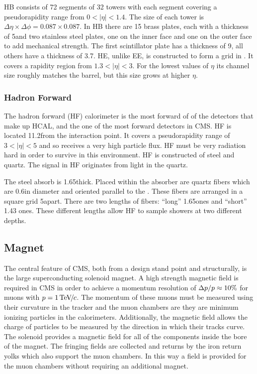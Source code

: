 HB consists of 72 segments of 32 towers with each segment covering a
pseudorapidity range from $0 < |\eta| < 1.4$. The size of each tower is $\Delta
\eta \times \Delta \phi = 0.087 \times 0.087$. In HB there are 15 brass plates,
each with a thickness of 5\centimeters and two stainless steel plates, one on
the inner face and one on the outer face to add mechanical strength. The first
scintillator plate has a thickness of 9\millimeters, all others have a
thickness of 3.7\millimeters. HE, unlike EE, is constructed to form a grid in
\coordetaphi. It covers a rapidity region from $1.3 < |\eta| < 3$. For the
lowest values of $\eta$ its channel size roughly matches the barrel, but this
size grows at higher $\eta$.

\subsubsection{Hadron Forward}

The hadron forward (HF) calorimeter is the most forward of of the detectors
that make up HCAL, and the one of the most forward detectors in CMS. HF is
located 11.2\meters from the interaction point. It covers a pseudorapidity
range of $3 < |\eta| < 5$ and so receives a very high particle flux. HF must be
very radiation hard in order to survive in this environment. HF is constructed
of steel and quartz. The signal in HF originates from \Cherenkov light in the
quartz.

The steel absorb is 1.65\meters thick. Placed within the absorber are quartz
fibers which are 0.6\millimeters in diameter and oriented parallel to the
\zaxis. These fibers are arranged in a square grid 5\millimeters apart. There
are two lengths of fibers: ``long'' 1.65\meters ones and ``short'' 1.43\meters
ones. These different lengths allow HF to sample showers at two different
depths.

\subsection{Magnet}

The central feature of CMS, both from a design stand point and structurally, is
the large superconducting solenoid magnet. A high strength magnetic field is
required in CMS in order to achieve a momentum resolution of $\Delta p
/ p \approx 10\%$ for muons with $p = 1 {\,\text{Te\hspace{-.08em}V\hspace{-0.16em}/\hspace{-0.08em}}c}$. The momentum of
these muons must be measured using their curvature in the tracker and the muon
chambers are they are minimum ionizing particles in the calorimeters.
Additionally, the magnetic field allows the charge of particles to be measured
by the direction in which their tracks curve. The solenoid provides a magnetic
field for all of the components inside the bore of the magnet. The fringing
fields are collected and returns by the iron return yolks which also support
the muon chambers. In this way a field is provided for the muon chambers
without requiring an additional magnet.

